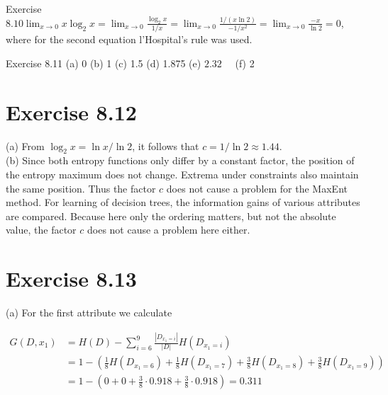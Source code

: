 \documentclass[10pt]{book}
\begin{document}
\begin{center}
\begin{enumerate}
\begin{center}
\begin{center}
\begin{center}
\begin{center}
\begin{center}
Exercise $8.10 \lim _{x \rightarrow 0} x \log _{2} x=\lim _{x \rightarrow 0} \frac{\log _{2} x}{1 / x}=\lim _{x \rightarrow 0} \frac{1 /(x \ln 2)}{-1 / x^{2}}=\lim _{x \rightarrow 0} \frac{-x}{\ln 2}=0$, where for the second equation l'Hospital's rule was used.


Exercise 8.11 (a) 0 (b) 1 (c) 1.5 (d) 1.875 (e) $2.32 \quad$ (f) 2

\section*{Exercise 8.12}
(a) From $\log _{2} x=\ln x / \ln 2$, it follows that $c=1 / \ln 2 \approx 1.44$.\\
(b) Since both entropy functions only differ by a constant factor, the position of the entropy maximum does not change. Extrema under constraints also maintain the same position. Thus the factor $c$ does not cause a problem for the MaxEnt method. For learning of decision trees, the information gains of various attributes are compared. Because here only the ordering matters, but not the absolute value, the factor $c$ does not cause a problem here either.

\section*{Exercise 8.13}
(a) For the first attribute we calculate

$$
\begin{aligned}
G\left(D, x_{1}\right) & =H(D)-\sum_{i=6}^{9} \frac{\left|D_{x_{1}=i}\right|}{|D|} H\left(D_{x_{1}=i}\right) \\
& =1-\left(\frac{1}{8} H\left(D_{x_{1}=6}\right)+\frac{1}{8} H\left(D_{x_{1}=7}\right)+\frac{3}{8} H\left(D_{x_{1}=8}\right)+\frac{3}{8} H\left(D_{x_{1}=9}\right)\right) \\
& =1-\left(0+0+\frac{3}{8} \cdot 0.918+\frac{3}{8} \cdot 0.918\right)=0.311
\end{aligned}
$$


\end{center}
\end{center}
\end{center}
\end{center}
\end{center}
\end{enumerate}
\end{center}
\end{document}
